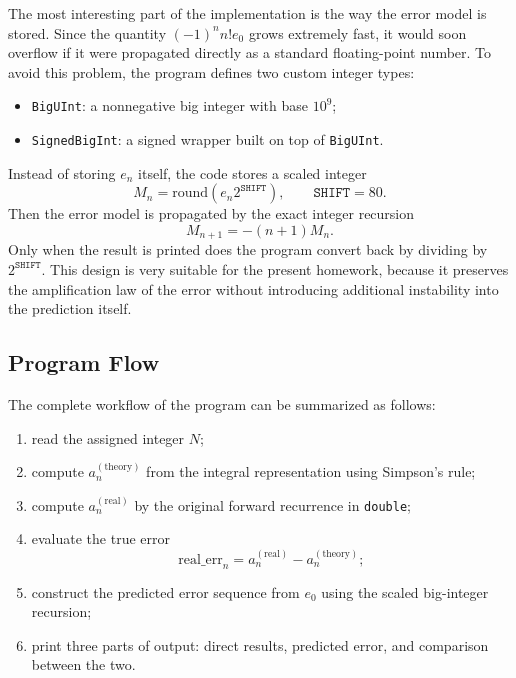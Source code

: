 \documentclass[12pt,a4paper]{article}
\begin{document}
The most interesting part of the implementation is the way the error model is stored. Since the quantity $(-1)^n n! e_0$ grows extremely fast, it would soon overflow if it were propagated directly as a standard floating-point number. To avoid this problem, the program defines two custom integer types:
\begin{itemize}
    \item \texttt{BigUInt}: a nonnegative big integer with base $10^9$;
    \item \texttt{SignedBigInt}: a signed wrapper built on top of \texttt{BigUInt}.
\end{itemize}

Instead of storing $e_n$ itself, the code stores a scaled integer
\begin{equation}
    M_n = \mathrm{round}(e_n 2^{\texttt{SHIFT}}), \qquad \texttt{SHIFT}=80.
\end{equation}
Then the error model is propagated by the exact integer recursion
\begin{equation}
    M_{n+1} = -(n+1)M_n.
\end{equation}
Only when the result is printed does the program convert back by dividing by $2^{\texttt{SHIFT}}$. This design is very suitable for the present homework, because it preserves the amplification law of the error without introducing additional instability into the prediction itself.

\subsection*{Program Flow}

The complete workflow of the program can be summarized as follows:
\begin{enumerate}[label=\arabic*.]
    \item read the assigned integer $N$;
    \item compute $a_n^{(\mathrm{theory})}$ from the integral representation using Simpson's rule;
    \item compute $a_n^{(\mathrm{real})}$ by the original forward recurrence in \texttt{double};
    \item evaluate the true error
    \begin{equation}
        \mathrm{real\_err}_n = a_n^{(\mathrm{real})} - a_n^{(\mathrm{theory})};
    \end{equation}
    \item construct the predicted error sequence from $e_0$ using the scaled big-integer recursion;
    \item print three parts of output: direct results, predicted error, and comparison between the two.
\end{enumerate}
\end{document}
